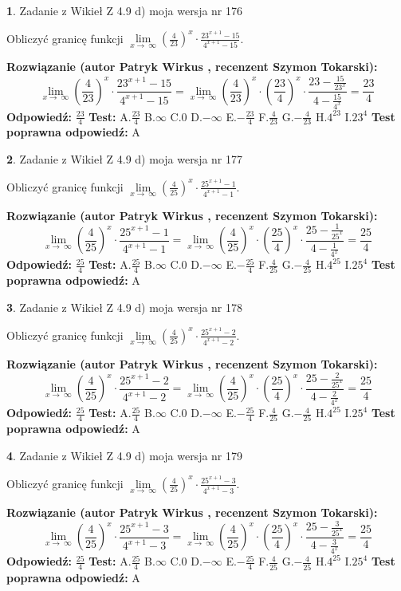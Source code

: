 \documentclass[12pt, a4paper]{article}
\theoremstyle{definition} %
\newtheorem{zad}{}
\newcommand{\zadStart}[1]{\begin{zad}#1\newline}
\newcommand{\zadStop}{\end{zad}}
\newcommand{\rozwStart}[2]{\noindent \textbf{Rozwiązanie (autor #1 , recenzent #2): }\newline}
\newcommand{\rozwStop}{\newline}
\newcommand{\odpStart}{\noindent \textbf{Odpowiedź:}\newline}
\newcommand{\odpStop}{\newline}
\newcommand{\testStart}{\noindent \textbf{Test:}\newline}
\newcommand{\testStop}{\newline}
\newcommand{\kluczStart}{\noindent \textbf{Test poprawna odpowiedź:}\newline}
\newcommand{\kluczStop}{\newline}
\begin{document}
\zadStart{Zadanie z Wikieł Z 4.9 d) moja wersja nr 176}


Obliczyć granicę funkcji  $\lim\limits_{x\to\ \infty}(\frac{4}{23})^{x}\cdot\frac{23^{x+1}-15}{4^{x+1}-15}$.
\zadStop
\rozwStart{Patryk Wirkus}{Szymon Tokarski}
$$\lim\limits_{x\to\ \infty}(\frac{4}{23})^{x}\cdot\frac{23^{x+1}-15}{4^{x+1}-15}=\lim\limits_{x\to\ \infty}(\frac{4}{23})^{x}\cdot(\frac{23}{4})^{x} \cdot \frac{23-\frac{15}{23^{x}}}{4-\frac{15}{4^{x}}} = \frac{23}{4}$$
\rozwStop
\odpStart
$\frac{23}{4}$
\odpStop
\testStart
A.$\frac{23}{4}$ B.$\infty$ C.$0$ D.$-\infty$ E.$-\frac{23}{4}$
F.$\frac{4}{23}$ G.$-\frac{4}{23}$
H.$4^{23}$
I.$23^{4}$
\testStop
\kluczStart
A
\kluczStop



\zadStart{Zadanie z Wikieł Z 4.9 d) moja wersja nr 177}


Obliczyć granicę funkcji  $\lim\limits_{x\to\ \infty}(\frac{4}{25})^{x}\cdot\frac{25^{x+1}-1}{4^{x+1}-1}$.
\zadStop
\rozwStart{Patryk Wirkus}{Szymon Tokarski}
$$\lim\limits_{x\to\ \infty}(\frac{4}{25})^{x}\cdot\frac{25^{x+1}-1}{4^{x+1}-1}=\lim\limits_{x\to\ \infty}(\frac{4}{25})^{x}\cdot(\frac{25}{4})^{x} \cdot \frac{25-\frac{1}{25^{x}}}{4-\frac{1}{4^{x}}} = \frac{25}{4}$$
\rozwStop
\odpStart
$\frac{25}{4}$
\odpStop
\testStart
A.$\frac{25}{4}$ B.$\infty$ C.$0$ D.$-\infty$ E.$-\frac{25}{4}$
F.$\frac{4}{25}$ G.$-\frac{4}{25}$
H.$4^{25}$
I.$25^{4}$
\testStop
\kluczStart
A
\kluczStop



\zadStart{Zadanie z Wikieł Z 4.9 d) moja wersja nr 178}


Obliczyć granicę funkcji  $\lim\limits_{x\to\ \infty}(\frac{4}{25})^{x}\cdot\frac{25^{x+1}-2}{4^{x+1}-2}$.
\zadStop
\rozwStart{Patryk Wirkus}{Szymon Tokarski}
$$\lim\limits_{x\to\ \infty}(\frac{4}{25})^{x}\cdot\frac{25^{x+1}-2}{4^{x+1}-2}=\lim\limits_{x\to\ \infty}(\frac{4}{25})^{x}\cdot(\frac{25}{4})^{x} \cdot \frac{25-\frac{2}{25^{x}}}{4-\frac{2}{4^{x}}} = \frac{25}{4}$$
\rozwStop
\odpStart
$\frac{25}{4}$
\odpStop
\testStart
A.$\frac{25}{4}$ B.$\infty$ C.$0$ D.$-\infty$ E.$-\frac{25}{4}$
F.$\frac{4}{25}$ G.$-\frac{4}{25}$
H.$4^{25}$
I.$25^{4}$
\testStop
\kluczStart
A
\kluczStop



\zadStart{Zadanie z Wikieł Z 4.9 d) moja wersja nr 179}


Obliczyć granicę funkcji  $\lim\limits_{x\to\ \infty}(\frac{4}{25})^{x}\cdot\frac{25^{x+1}-3}{4^{x+1}-3}$.
\zadStop
\rozwStart{Patryk Wirkus}{Szymon Tokarski}
$$\lim\limits_{x\to\ \infty}(\frac{4}{25})^{x}\cdot\frac{25^{x+1}-3}{4^{x+1}-3}=\lim\limits_{x\to\ \infty}(\frac{4}{25})^{x}\cdot(\frac{25}{4})^{x} \cdot \frac{25-\frac{3}{25^{x}}}{4-\frac{3}{4^{x}}} = \frac{25}{4}$$
\rozwStop
\odpStart
$\frac{25}{4}$
\odpStop
\testStart
A.$\frac{25}{4}$ B.$\infty$ C.$0$ D.$-\infty$ E.$-\frac{25}{4}$
F.$\frac{4}{25}$ G.$-\frac{4}{25}$
H.$4^{25}$
I.$25^{4}$
\testStop
\kluczStart
A
\kluczStop
\end{document}
